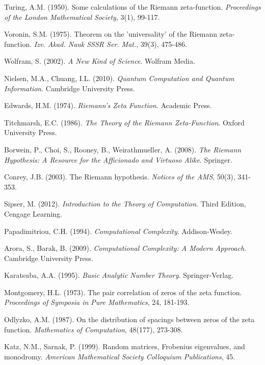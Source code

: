 \documentclass[12pt]{article}
\theoremstyle{plain}
\theoremstyle{definition}
\begin{document}
\begin{thebibliography}{99}

 Turing, A.M. (1950). Some calculations of the Riemann zeta-function. \emph{Proceedings of the London Mathematical Society}, 3(1), 99-117.

 Voronin, S.M. (1975). Theorem on the 'universality' of the Riemann zeta-function. \emph{Izv. Akad. Nauk SSSR Ser. Mat.}, 39(3), 475-486.

 Wolfram, S. (2002). \emph{A New Kind of Science}. Wolfram Media.

 Nielsen, M.A., Chuang, I.L. (2010). \emph{Quantum Computation and Quantum Information}. Cambridge University Press.

 Edwards, H.M. (1974). \emph{Riemann's Zeta Function}. Academic Press.

 Titchmarsh, E.C. (1986). \emph{The Theory of the Riemann Zeta-Function}. Oxford University Press.

 Borwein, P., Choi, S., Rooney, B., Weirathmueller, A. (2008). \emph{The Riemann Hypothesis: A Resource for the Afficionado and Virtuoso Alike}. Springer.

 Conrey, J.B. (2003). The Riemann hypothesis. \emph{Notices of the AMS}, 50(3), 341-353.

 Sipser, M. (2012). \emph{Introduction to the Theory of Computation}. Third Edition, Cengage Learning.

 Papadimitriou, C.H. (1994). \emph{Computational Complexity}. Addison-Wesley.

 Arora, S., Barak, B. (2009). \emph{Computational Complexity: A Modern Approach}. Cambridge University Press.

 Karatsuba, A.A. (1995). \emph{Basic Analytic Number Theory}. Springer-Verlag.

 Montgomery, H.L. (1973). The pair correlation of zeros of the zeta function. \emph{Proceedings of Symposia in Pure Mathematics}, 24, 181-193.

 Odlyzko, A.M. (1987). On the distribution of spacings between zeros of the zeta function. \emph{Mathematics of Computation}, 48(177), 273-308.

 Katz, N.M., Sarnak, P. (1999). Random matrices, Frobenius eigenvalues, and monodromy. \emph{American Mathematical Society Colloquium Publications}, 45.


\end{thebibliography}
\end{document}
